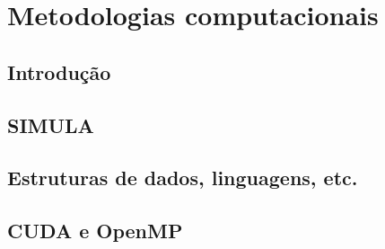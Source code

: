 \chapter{Metodologias computacionais}
\label{CapMetodologiasComputacionais}

\section{Introdução}

\section{SIMULA}

\section{Estruturas de dados, linguagens, etc.}

\section{CUDA e OpenMP}
